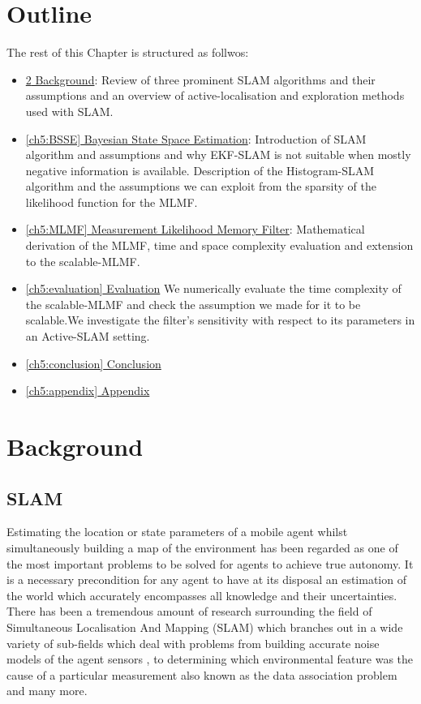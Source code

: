 \section{Outline}


The rest of this Chapter is structured as follwos:


\begin{itemize}
 \item \hyperref[ch5:background]{\ref{ch5:background} Background}: Review of three prominent SLAM algorithms
 and their assumptions and an overview of active-localisation and exploration methods used with SLAM.
 \item \hyperref[ch5:BSSE]{\ref{ch5:BSSE} Bayesian State Space Estimation}:  Introduction of SLAM algorithm 
 and assumptions and why EKF-SLAM is not suitable when mostly negative information is available. Description 
 of the Histogram-SLAM algorithm and the assumptions we can exploit from the sparsity of the likelihood function
 for the MLMF.
 \item \hyperref[ch5:MLMF]{\ref{ch5:MLMF} Measurement Likelihood Memory Filter}:
 Mathematical derivation of the MLMF, time and space complexity evaluation and extension to 
 the scalable-MLMF.
 \item \hyperref[ch5:evaluation]{\ref{ch5:evaluation} Evaluation}
 We numerically evaluate the time complexity of the scalable-MLMF and check the assumption we made 
for it to be scalable.We investigate the filter's sensitivity with respect to its parameters in an Active-SLAM setting.
 \item \hyperref[ch5:conclusion]{\ref{ch5:conclusion} Conclusion}
 \item \hyperref[ch5:appendix]{\ref{ch5:appendix} Appendix}
\end{itemize}

\section{Background}\label{ch5:background}

\subsection{SLAM}

Estimating the location or state parameters of a mobile agent whilst simultaneously building a map of the environment has been
regarded as one of the most important problems to be solved for agents to achieve true autonomy. It is a necessary precondition for 
any agent to have at its disposal an estimation of the world which accurately encompasses all knowledge and their uncertainties. There has 
been a tremendous amount of research surrounding the field of Simultaneous Localisation And Mapping (SLAM) which branches out in a wide variety of sub-fields 
which deal with problems from building accurate noise models of the agent sensors \cite{Plagemann07gaussianbeam}, to determining which environmental 
feature was the cause of a particular measurement also known as the data association problem \cite{DataAssociation2003} and many more. 

